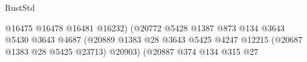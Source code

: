 \begin{lexlean}{RustStd}
\begin{coremodule}
                                                                              @16475
                                                                              @16478
                                                                              @16481
                                                                              @16232)
                                                                            (@20772
                                                                              @5428
                                                                              @1387
                                                                              @873
                                                                              @134
                                                                              @3643
                                                                              @5430
                                                                              @3643
                                                                              @4687
                                                                              (@20889
                                                                                @1383
                                                                                @28
                                                                                @3643
                                                                                @5425
                                                                                @4247
                                                                                @12215
                                                                                (@20687
                                                                                  @1383
                                                                                  @28
                                                                                  @5425
                                                                                  @23713)
                                                                                @20903)
                                                                              (@20887
                                                                                @374
                                                                                @134
                                                                                @315
                                                                                @27

\end{coremodule}
\end{lexlean}
